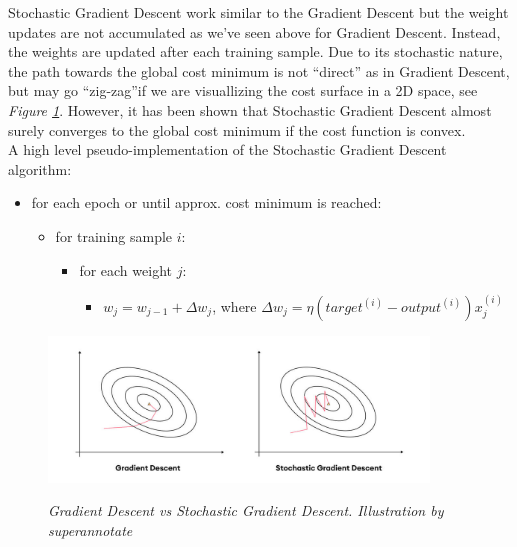 Stochastic Gradient Descent work similar to the Gradient Descent but the weight updates are not accumulated as we’ve seen above for Gradient Descent. Instead, the weights are updated after each training sample. Due to its stochastic nature, the path towards the global cost minimum is not “direct” as in Gradient Descent, but may go “zig-zag”if we are visuallizing the cost surface in a 2D space, see \textit{Figure \ref{fig:sgdvsgd}}. However, it has been shown that Stochastic Gradient Descent almost surely converges to the global cost minimum if the cost function is convex. \\

A high level pseudo-implementation of the Stochastic Gradient Descent algorithm:

\begin{itemize}[label=$\circ$]
    \item for each epoch or until approx. cost minimum is reached:
        \begin{itemize}[label=$\circ$, topsep=0pt]
            \item for training sample \(i\):
              \begin{itemize}[label=$\circ$, topsep=5pt]
                \item for each weight \(j\):
                    \begin{itemize}[label=$\circ$, topsep=10pt]
                        \item \(w_j = w_{j-1} + \Delta w_j\), where \(\Delta w_j = \eta (target^{(i)} - output^{(i)})x_{j}^{(i)}\)
                    \end{itemize}
            \end{itemize}
        \end{itemize}
\end{itemize}

\begin{figure}[H]
\centering
\begin{adjustbox}{trim=0cm 0cm 0cm 1cm, clip}
\includegraphics[width=0.9\textwidth]{imatges/preliminaries/sgdvsgd.jpeg}
\end{adjustbox}
    \caption[Gradient Descent vs Stochastic Gradient Descent]{\textit{Gradient Descent vs Stochastic Gradient Descent. Illustration by superannotate}}
{\label{fig:sgdvsgd}}
\end{figure}

